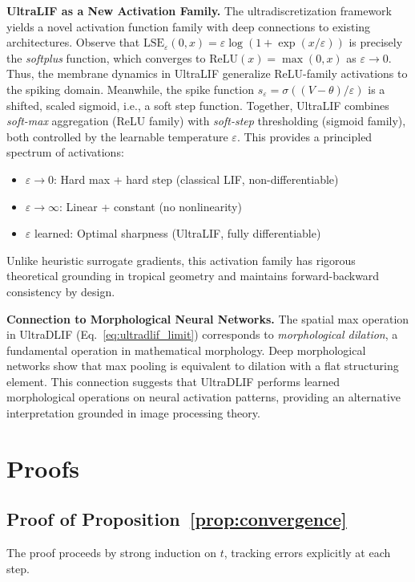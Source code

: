 \documentclass{article}
\theoremstyle{plain}
\theoremstyle{definition}
\theoremstyle{remark}
\newcommand{\lse}{\mathrm{LSE}}
\newcommand{\eps}{\varepsilon}
\begin{document}
\textbf{UltraLIF as a New Activation Family.} The ultradiscretization framework yields a novel activation function family with deep connections to existing architectures. Observe that $\lse_\eps(0, x) = \eps \log(1 + \exp(x/\eps))$ is precisely the \emph{softplus} function, which converges to $\mathrm{ReLU}(x) = \max(0, x)$ as $\eps \to 0$. Thus, the membrane dynamics in UltraLIF generalize ReLU-family activations to the spiking domain. Meanwhile, the spike function $s_\eps = \sigma((V - \theta)/\eps)$ is a shifted, scaled sigmoid, i.e., a soft step function. Together, UltraLIF combines \emph{soft-max} aggregation (ReLU family) with \emph{soft-step} thresholding (sigmoid family), both controlled by the learnable temperature $\eps$. This provides a principled spectrum of activations:
\begin{itemize}[nosep,leftmargin=*]
    \item $\eps \to 0$: Hard max + hard step (classical LIF, non-differentiable)
    \item $\eps \to \infty$: Linear + constant (no nonlinearity)
    \item $\eps$ learned: Optimal sharpness (UltraLIF, fully differentiable)
\end{itemize}
Unlike heuristic surrogate gradients, this activation family has rigorous theoretical grounding in tropical geometry and maintains forward-backward consistency by design.

\textbf{Connection to Morphological Neural Networks.} The spatial max operation in UltraDLIF (Eq.~\ref{eq:ultradlif_limit}) corresponds to \emph{morphological dilation}, a fundamental operation in mathematical morphology. Deep morphological networks \citep{franchi2020deep} show that max pooling is equivalent to dilation with a flat structuring element. This connection suggests that UltraDLIF performs learned morphological operations on neural activation patterns, providing an alternative interpretation grounded in image processing theory.

\section{Proofs}
\label{app:proofs}

\subsection{Proof of Proposition~\ref{prop:convergence}}

The proof proceeds by strong induction on $t$, tracking errors explicitly at each step.
\end{document}
